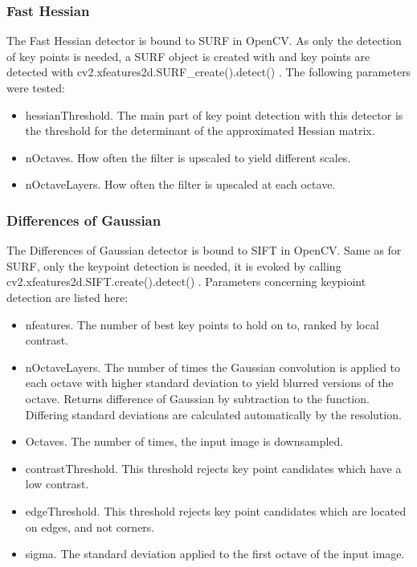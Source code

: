 \documentclass[Bachelorarbeit.tex]{subfiles}
\begin{document}
\subsubsection{Fast Hessian}
The Fast Hessian detector is bound to SURF in OpenCV. As only the detection of key points is needed, a SURF object is created with  and key points are detected with cv2.xfeatures2d.SURF\_create().detect() \citep{itseez2019theopencv}. The following parameters were tested:
\begin{itemize}
	\item hessianThreshold. The main part of key point detection with this detector is the threshold for the determinant of the approximated Hessian matrix.
	\item nOctaves. How often the filter is upscaled to yield different scales.
	\item nOctaveLayers. How often the filter is upscaled at each octave.
\end{itemize}


\subsubsection{Differences of Gaussian}
The Differences of Gaussian detector is bound to SIFT in OpenCV. Same as for SURF, only the keypoint detection is needed, it is evoked by calling cv2.xfeatures2d.SIFT.create().detect() \citep{itseez2019theopencv}. Parameters concerning keypioint detection are listed here:
\begin{itemize}
	\item nfeatures. The number of best key points to hold on to, ranked by local contrast.
	\item nOctaveLayers. The number of times the Gaussian convolution is applied to each octave with higher standard deviation to yield blurred versions of the octave. Returns difference of Gaussian by subtraction to the function. Differing standard deviations are calculated automatically by the resolution.
	\item Octaves. The number of times, the input image is downsampled.
	\item contrastThreshold. This threshold rejects key point candidates which have a low contrast.
	\item edgeThreshold. This threshold rejects key point candidates which are located on edges, and not corners.
	\item sigma. The standard deviation applied to the first octave of the input image. 

\end{itemize}
\end{document}
